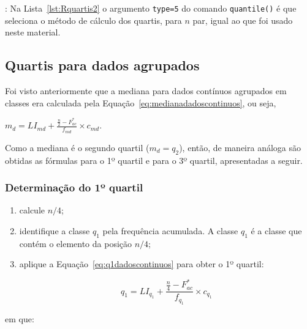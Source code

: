 \documentclass[11pt,fleqn]{book} %
\begin{document}
: Na Lista~\ref{lst:Rquartis2} o argumento  \texttt{type=5} do comando \texttt{quantile()} é que seleciona o método de cálculo dos quartis, para $n$ par, igual ao que foi usado neste material. \\


\subsection{Quartis para dados agrupados}
\vspace{0,3cm}

Foi visto anteriormente que a mediana para dados contínuos agrupados em classes era calculada pela Equação~\ref{eq:medianadadoscontinuos}, ou seja,

\begin{center}
$\displaystyle m_d=LI_{md}+\frac{\frac{n}{2}-F_{ac}^*}{f_{md}} \times c_{md}$.
\end{center}
	

Como a mediana é o segundo quartil ($m_d=q_2$), então, de maneira análoga são obtidas as fórmulas para o 1º quartil e para o 3º quartil, apresentadas a seguir. \\


\subsubsection{Determinação do 1º quartil}
\vspace{0,3cm}

\begin{enumerate}

\item calcule $n/4$;
\item identifique a classe $q_1$ pela frequência acumulada. A classe $q_1$ é a classe que contém o elemento da posição $n/4$;
\item aplique a Equação~\ref{eq:q1dadoscontinuos} para obter o 1º quartil:

\begin{eBox}
\vspace{-0.5cm}
\begin{equation} \label{eq:q1dadoscontinuos}
	q_1=LI_{q_1}+\frac{\frac{n}{4}-F_{ac}^*}{f_{q_1}} \times c_{q_1}
\end{equation}
\end{eBox}

\end{enumerate}

\noindent em que:
\end{document}
